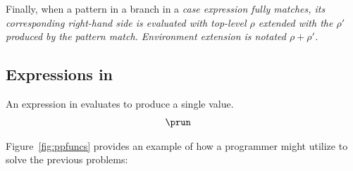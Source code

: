 \documentclass[manuscript,screen,review, 12pt, nonacm]{acmart}
\begin{document}
Finally, when a pattern in a branch in a \it{case} expression fully matches, its
corresponding right-hand side is evaluated with top-level $\rho$ extended with
the $\rho'$ produced by the pattern match. Environment extension is notated
$\rho + \rho'$. 

\subsection{Expressions in \PPlus}

    An expression in \PPlus evaluates to produce a single value. 
    \begin{align*}
        &\prun
    \end{align*}
    
    \ppsemantics 
      
      \bigskip 

    
    Figure~\ref{fig:ppfuncs} provides an example of how a programmer might utilize
    \PPlus to solve the previous problems: 
\end{document}
